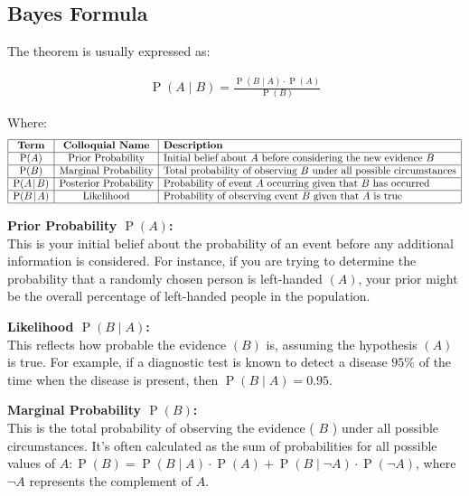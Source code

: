\documentclass[
  12 pt,
  a4paper,
]{book}
\numberwithin{equation}{section}
\theoremstyle{plain}      %
\theoremstyle{definition} %
\theoremstyle{remark}     %
\theoremstyle{note}         %
\begin{document}
\newpage

\hypertarget{bayes-formula}{%
\subsection{Bayes Formula}\label{bayes-formula}}

The theorem is usually expressed as:

\begin{align}
\operatorname{P}(A\! \mid\! B)=\frac{\operatorname{P}(B\! \mid\! A) \cdot \operatorname{P}(A)}{\operatorname{P}(B)}
\end{align}

Where: \[
\begin{array}{|c|c|l|}
\hline
\textbf{Term} & \textbf{Colloquial Name} & \textbf{Description} \\
\hline
\operatorname{P}(A) & \text{Prior Probability} & \text{Initial belief about \(A\) before considering the new evidence \(B\)} \\
\hline
\operatorname{P}(B) & \text{Marginal Probability} & \text{Total probability of observing \(B\) under all possible circumstances} \\
\hline
\operatorname{P}(A\! \mid\! B) & \text{Posterior Probability} & \text{Probability of event \(A\) occurring given that \(B\) has occurred} \\
\hline
\operatorname{P}(B\! \mid\! A) & \text{Likelihood} & \text{Probability of observing event \(B\) given that \(A\) is true} \\
\hline
\end{array}
\]

\textbf{Prior Probability \(\operatorname{P}(A)\):}\\
This is your initial belief about the probability of an event before any
additional information is considered. For instance, if you are trying to
determine the probability that a randomly chosen person is left-handed
\((A)\), your prior might be the overall percentage of left-handed
people in the population.

\textbf{Likelihood \(\operatorname{P}(B\! \mid\! A)\):}\\
This reflects how probable the evidence \((B)\) is, assuming the
hypothesis \((A)\) is true. For example, if a diagnostic test is known
to detect a disease \(95 \%\) of the time when the disease is present,
then \(\operatorname{P}(B\! \mid\! A)=0.95\).

\textbf{Marginal Probability \(\operatorname{P}(B)\):}\\
This is the total probability of observing the evidence ( \(B\) ) under
all possible circumstances. It's often calculated as the sum of
probabilities for all possible values of
\(A: \operatorname{P}(B)=\operatorname{P}(B\! \mid\! A) \cdot \operatorname{P}(A)+\operatorname{P}(B\! \mid\! \neg A) \cdot \operatorname{P}(\neg A)\),
where \(\neg A\) represents the complement of \(A\).
\end{document}
